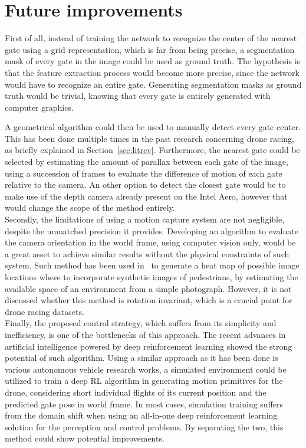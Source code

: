 \chapter{Future improvements}

First of all, instead of training the network to recognize the center of the
nearest gate using a grid representation, which is far from being precise, a
segmentation mask of every gate in the image could be used as ground truth. The
hypothesis is that the feature extraction process would become more precise,
since the network would have to recognize an entire gate. Generating
segmentation masks as ground truth would be trivial, knowing that every gate is
entirely generated with computer graphics.

A geometrical algorithm could then be used to manually detect every gate
center. This has been done multiple times in the past research concerning drone
racing, as briefly explained in Section~\ref{sec:litrev}. Furthermore, the
nearest gate could be selected by estimating the amount of parallax between
each gate of the image, using a succession of frames to evaluate the difference
of motion of each gate relative to the camera. An other option to detect the
closest gate would be to make use of the depth camera already present on the
Intel Aero, however that would change the scope of the method entirely.\\

Secondly, the limitations of using a motion capture system are not negligible,
despite the unmatched precision it provides. Developing an algorithm to
evaluate the camera orientation in the world frame, using computer vision only,
would be a great asset to achieve similar results without the physical
constraints of such system. Such method has been used in~\cite{CheungWBM17} to
generate a heat map of possible image locations where to incorporate synthetic
images of pedestrians, by estimating the available space of an environment from
a simple photograph. However, it is not discussed whether this method is
rotation invariant, which is a crucial point for drone racing datasets.\\

Finally, the proposed control strategy, which suffers from its simplicity and
inefficiency, is one of the bottlenecks of this approach. The recent advances
in artificial intelligence powered by deep reinforcement learning showed the
strong potential of such algorithm. Using a similar approach as it has been
done is various autonomous vehicle research works, a simulated environment
could be utilized to train a deep RL algorithm in generating motion primitives
for the drone, considering short individual flights of its current position and
the predicted gate pose in world frame. In most cases, simulation training
suffers from the domain shift when using an all-in-one deep reinforcement
learning solution for the perception and control problems. By separating the
two, this method could show potential improvements.
